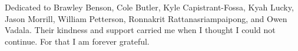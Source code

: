 
\begin{dedication}


Dedicated to Brawley Benson, Cole Butler, Kyle Capistrant-Fossa, Kyah Lucky, Jason Morrill, William Petterson, Ronnakrit Rattanasriampaipong, and Owen Vadala. Their kindness and support carried me when I thought I could not continue. For that I am forever grateful. 

\end{dedication}